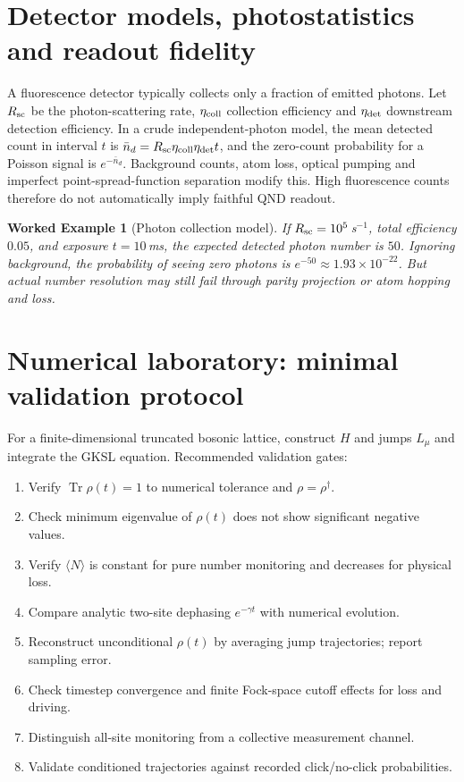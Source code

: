 \documentclass[11pt,a4paper]{article}
\newtheorem{example}{Worked Example}\newtheorem{remark}{Physical qualification}
\newcommand{\tr}{\operatorname{Tr}}\newcommand{\D}{\mathcal D}\newcommand{\kb}{k_{\mathrm B}}\newcommand{\E}{\mathbb E}\newcommand{\Ha}{\mathcal H}\newcommand{\ket}[1]{|#1\rangle}\newcommand{\bra}[1]{\langle#1|}
\begin{document}
\section{Detector models, photostatistics and readout fidelity}
A fluorescence detector typically collects only a fraction of emitted photons. Let $R_{\rm sc}$ be the photon-scattering rate, $\eta_{\rm coll}$ collection efficiency and $\eta_{\rm det}$ downstream detection efficiency. In a crude independent-photon model, the mean detected count in interval $t$ is $\bar n_d=R_{\rm sc}\eta_{\rm coll}\eta_{\rm det}t$, and the zero-count probability for a Poisson signal is $e^{-\bar n_d}$. Background counts, atom loss, optical pumping and imperfect point-spread-function separation modify this. High fluorescence counts therefore do not automatically imply faithful QND readout.
\begin{example}[Photon collection model]
If $R_{\rm sc}=10^5\,$s$^{-1}$, total efficiency $0.05$, and exposure $t=10\,$ms, the expected detected photon number is $50$. Ignoring background, the probability of seeing zero photons is $e^{-50}\approx1.93\times10^{-22}$. But actual number resolution may still fail through parity projection or atom hopping and loss.
\end{example}
\section{Numerical laboratory: minimal validation protocol}
For a finite-dimensional truncated bosonic lattice, construct $H$ and jumps $L_\mu$ and integrate the GKSL equation. Recommended validation gates:
\begin{enumerate}[label=\textbf{V\arabic*.},leftmargin=*]
\item Verify $\tr\rho(t)=1$ to numerical tolerance and $\rho=\rho^\dagger$.
\item Check minimum eigenvalue of $\rho(t)$ does not show significant negative values.
\item Verify $\langle N\rangle$ is constant for pure number monitoring and decreases for physical loss.
\item Compare analytic two-site dephasing $e^{-\gamma t}$ with numerical evolution.
\item Reconstruct unconditional $\rho(t)$ by averaging jump trajectories; report sampling error.
\item Check timestep convergence and finite Fock-space cutoff effects for loss and driving.
\item Distinguish all-site monitoring from a collective measurement channel.
\item Validate conditioned trajectories against recorded click/no-click probabilities.
\end{enumerate}
\end{document}
